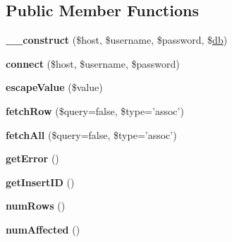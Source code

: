 \subsection*{Public Member Functions}
\begin{DoxyCompactItemize}
\item 
\hypertarget{interfacedatabase_adapter_a81fcddb424f13e0862ee3f7e1ea57ce9}{
{\bfseries \_\-\_\-construct} (\$host, \$username, \$password, \$\hyperlink{classdb}{db})}
\label{interfacedatabase_adapter_a81fcddb424f13e0862ee3f7e1ea57ce9}

\item 
\hypertarget{interfacedatabase_adapter_a4c4f3316747e665b9e02f6ddcba4117c}{
{\bfseries connect} (\$host, \$username, \$password)}
\label{interfacedatabase_adapter_a4c4f3316747e665b9e02f6ddcba4117c}

\item 
\hypertarget{interfacedatabase_adapter_a039ae2e8f2bf579fd75d9df8df87eee3}{
{\bfseries escapeValue} (\$value)}
\label{interfacedatabase_adapter_a039ae2e8f2bf579fd75d9df8df87eee3}

\item 
\hypertarget{interfacedatabase_adapter_a529385852efa66f19288496930ee5394}{
{\bfseries fetchRow} (\$query=false, \$type='assoc')}
\label{interfacedatabase_adapter_a529385852efa66f19288496930ee5394}

\item 
\hypertarget{interfacedatabase_adapter_a861f65695740a1d866ce1001f0ae706d}{
{\bfseries fetchAll} (\$query=false, \$type='assoc')}
\label{interfacedatabase_adapter_a861f65695740a1d866ce1001f0ae706d}

\item 
\hypertarget{interfacedatabase_adapter_a24ada5decce3d1b79cd82f5a90ccf404}{
{\bfseries getError} ()}
\label{interfacedatabase_adapter_a24ada5decce3d1b79cd82f5a90ccf404}

\item 
\hypertarget{interfacedatabase_adapter_ac73f1d8cddbdfc35ca442189378a073c}{
{\bfseries getInsertID} ()}
\label{interfacedatabase_adapter_ac73f1d8cddbdfc35ca442189378a073c}

\item 
\hypertarget{interfacedatabase_adapter_af37433a300db1f607ee789d22828a0a0}{
{\bfseries numRows} ()}
\label{interfacedatabase_adapter_af37433a300db1f607ee789d22828a0a0}

\item 
\hypertarget{interfacedatabase_adapter_acac8dfe61e7840f9a1e672ebede0be21}{
{\bfseries numAffected} ()}
\label{interfacedatabase_adapter_acac8dfe61e7840f9a1e672ebede0be21}


\end{DoxyCompactItemize}
